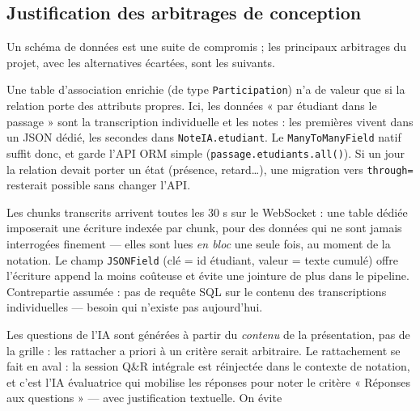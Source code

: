 \documentclass[12pt,a4paper]{report}
\begin{document}
\subsection*{Justification des arbitrages de conception}

Un schéma de données est une suite de compromis ; les principaux arbitrages du
projet, avec les alternatives écartées, sont les suivants.

\begin{description}[style=nextline]
  \item[Relation N--N \texttt{PassageEtudiant} $\leftrightarrow$ \texttt{User},
        sans table intermédiaire explicite.]
        Une table d'association enrichie (de type \texttt{Participation}) n'a
        de valeur que si la relation porte des attributs propres. Ici, les
        données « par étudiant dans le passage » sont la transcription
        individuelle et les notes : les premières vivent dans un JSON dédié,
        les secondes dans \texttt{NoteIA.etudiant}. Le \texttt{ManyToManyField}
        natif suffit donc, et garde l'API ORM simple
        (\texttt{passage.etudiants.all()}). Si un jour la relation devait
        porter un état (présence, retard…), une migration vers
        \texttt{through=} resterait possible sans changer l'API.
  \item[Transcriptions individuelles en JSON plutôt qu'en table dédiée.]
        Les chunks transcrits arrivent toutes les 30 s sur le WebSocket :
        une table dédiée imposerait une écriture indexée par chunk, pour des
        données qui ne sont jamais interrogées finement --- elles sont lues
        \emph{en bloc} une seule fois, au moment de la notation. Le champ
        \texttt{JSONField} (clé = id étudiant, valeur = texte cumulé) offre
        l'écriture append la moins coûteuse et évite une jointure de plus dans
        le pipeline. Contrepartie assumée : pas de requête SQL sur le contenu
        des transcriptions individuelles --- besoin qui n'existe pas
        aujourd'hui.
  \item[\texttt{QuestionPosee} sans relation vers \texttt{CritereNotation}.]
        Les questions de l'IA sont générées à partir du \emph{contenu} de la
        présentation, pas de la grille : les rattacher a priori à un critère
        serait arbitraire. Le rattachement se fait en aval : la session Q\&R
        intégrale est réinjectée dans le contexte de notation, et c'est l'IA
        évaluatrice qui mobilise les réponses pour noter le critère
        « Réponses aux questions » --- avec justification textuelle. On évite

\end{description}
\end{document}
